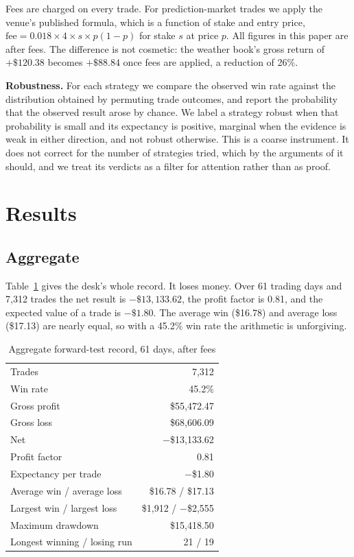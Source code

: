 \documentclass[conference]{IEEEtran}
\begin{document}
Fees are charged on every trade. For prediction-market trades we apply the
venue's published formula, which is a function of stake and entry price,
$\text{fee} = 0.018 \times 4 \times s \times p(1-p)$ for stake $s$ at price
$p$. All figures in this paper are after fees. The difference is not cosmetic:
the weather book's gross return of $+\$120.38$ becomes $+\$88.84$ once fees are
applied, a reduction of 26\%.

\textbf{Robustness.} For each strategy we compare the observed win rate against
the distribution obtained by permuting trade outcomes, and report the
probability that the observed result arose by chance. We label a strategy
robust when that probability is small and its expectancy is positive, marginal
when the evidence is weak in either direction, and not robust otherwise. This
is a coarse instrument. It does not correct for the number of strategies
tried, which by the arguments of \cite{harvey2016} it should, and we treat its
verdicts as a filter for attention rather than as proof.

\section{Results}
\label{sec:results}

\subsection{Aggregate}
Table~\ref{tab:overall} gives the desk's whole record. It loses money. Over 61
trading days and 7{,}312 trades the net result is $-\$13{,}133.62$, the profit
factor is 0.81, and the expected value of a trade is $-\$1.80$. The average win
(\$16.78) and average loss (\$17.13) are nearly equal, so with a 45.2\% win
rate the arithmetic is unforgiving.

\begin{table}[t]
\caption{Aggregate forward-test record, 61 days, after fees}
\label{tab:overall}
\centering
\begin{tabular}{lr}
\toprule
Trades & 7{,}312 \\
Win rate & 45.2\% \\
Gross profit & \$55{,}472.47 \\
Gross loss & \$68{,}606.09 \\
Net & $-$\$13{,}133.62 \\
Profit factor & 0.81 \\
Expectancy per trade & $-$\$1.80 \\
Average win / average loss & \$16.78 / \$17.13 \\
Largest win / largest loss & \$1{,}912 / $-$\$2{,}555 \\
Maximum drawdown & \$15{,}418.50 \\
Longest winning / losing run & 21 / 19 \\
\bottomrule
\end{tabular}
\end{table}
\end{document}
